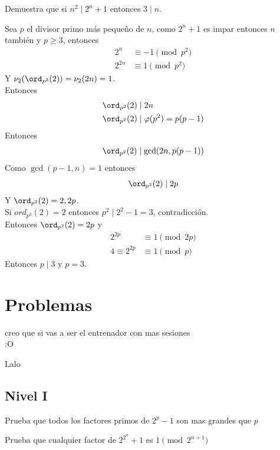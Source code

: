 \documentclass[11pt]{scrartcl}
\newcommand{\thmdifficulty}{0}
\newcommand{\problemdiff}[1]{\renewcommand{\thmdifficulty}{#1}}
\begin{document}
\begin{example}
   Demuestra que si $n^2 \mid 2^n+1$ entonces $3\mid n$.
\end{example}

\begin{soln}

Sea $p$ el divisor primo más pequeño de $n$, como $2^n+1$ es impar entonces $n$ también y $p\geq 3$, entonces 
\begin{align*}
2^n &\equiv -1 \pmod p^2 \\
2^{2n} &\equiv 1 \pmod p^2 
\end{align*}
Y $\nu_2(\ord_{p^2}(2))=\nu_2(2n)=1$. \\

Entonces 
\begin{align*}
    \ord_{p^2}(2) &\mid 2n \\ 
    \ord_{p^2}(2) &\mid \varphi(p^2)=p(p-1)
\end{align*}
Entonces
\[\ord_{p^2}(2) \mid \gcd (2n, p(p-1))\]
Como $\gcd (p-1, n)=1$ entonces 
\[\ord_{p^2}(2) \mid 2p\]
Y $\ord_{p^2}(2) =2, 2p$. \\
Si $ord_{p^2}(2)=2$ entonces $p^2 \mid 2^2-1=3$, contradicción. \\
Entonces $\ord_{p^2}(2)=2p$ y 
\begin{align*}
    

2^{2p} &\equiv 1 \pmod {2p} \\
4 \equiv 2^{2p} &\equiv 1 \pmod {p} 
\end{align*}
Entonces $p \mid 3$ y $p=3$.
\end{soln}

\newpage 
\section{Problemas}
\epigraph{creo que si vas a ser el entrenador con mas sesiones \\ :O}{Lalo} 
\subsection{Nivel I}
\problemdiff{3}
\begin{problem}
    Prueba que todos los factores primos de $2^p-1$ son mas grandes que $p$
\end{problem}

\problemdiff{3}
\begin{problem}
    Prueba que cualquier factor de $2^{2^{n}}+1$ es $1 \pmod{ 2^{n+1}}$
\end{problem}
\end{document}
